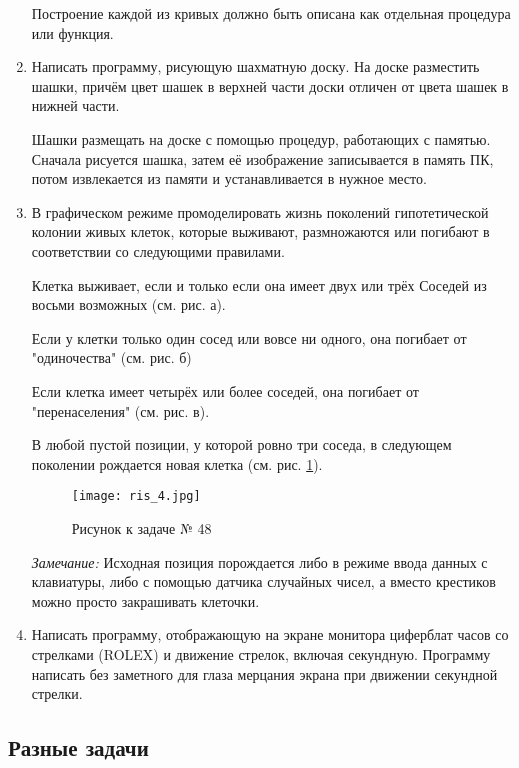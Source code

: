 \begin{enumerate}
Построение каждой из кривых должно быть описана как отдельная процедура или функция.

\item Написать программу, рисующую шахматную доску. На доске разместить шашки, причём цвет шашек в верхней части доски отличен от цвета шашек в нижней части.

Шашки размещать на доске с помощью процедур, работающих с памятью. Сначала рисуется шашка, затем её изображение записывается в память ПК, потом извлекается из памяти и устанав­ливается в нужное место.

\item В графическом режиме промоделировать жизнь поко­лений гипотетической колонии живых клеток, которые выживают, размножаются или погибают в соответствии со следующими прави­лами.

Клетка выживает, если и только если она имеет двух или трёх Соседей из восьми возможных (см. рис. а).
 
Если у клетки только один сосед или вовсе ни одного, она поги­бает от "одиночества" (см. рис. б)

Если клетка имеет четырёх или более соседей, она погибает от "перенаселения" (см. рис. в).

В любой пустой позиции, у которой ровно три соседа, в следу­ющем поколении рождается новая клетка (см. рис. \ref{ris3}).
\begin{figure}[!hb]
\centerline{
\texttt{[image: ris\_4.jpg]}}
\caption{Рисунок к задаче № 48}
\label{ris3}
\end{figure}

{\it Замечание:} Исходная позиция порождается либо в режиме вво­да данных с клавиатуры, либо с помощью датчика случайных чисел, а вместо крестиков можно просто закрашивать клеточки.

 \item Написать программу, отображающую на экране монитора циферблат часов со стрелками (ROLEX) и движение стрелок, включая секундную. Программу написать без заметного для глаза мерцания экрана при движении секундной стрелки.
 
 \end{enumerate}  

\subsection{Разные задачи}

